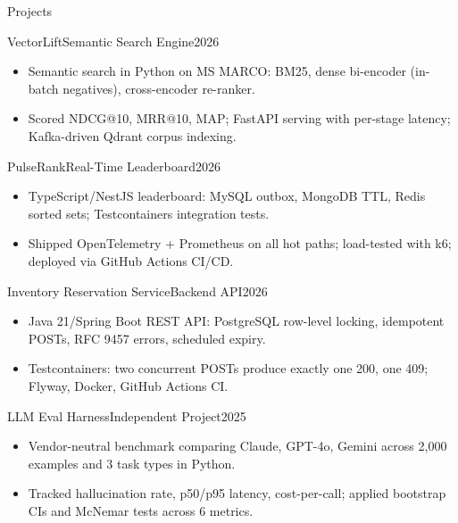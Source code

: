 \documentclass[]{mcdowellcv}
\begin{document}
\begin{cvsection}{Projects}
  \begin{cvsubsection}{VectorLift}{Semantic Search Engine}{2026}
    \begin{itemize}
      \item Semantic search in Python on MS MARCO: BM25, dense bi-encoder (in-batch negatives), cross-encoder re-ranker.
      \item Scored NDCG@10, MRR@10, MAP; FastAPI serving with per-stage latency; Kafka-driven Qdrant corpus indexing.
    \end{itemize}
    \vspace{-1.5pt}
  \end{cvsubsection}

  \begin{cvsubsection}{PulseRank}{Real-Time Leaderboard}{2026}
    \begin{itemize}
      \item TypeScript/NestJS leaderboard: MySQL outbox, MongoDB TTL, Redis sorted sets; Testcontainers integration tests.
      \item Shipped OpenTelemetry + Prometheus on all hot paths; load-tested with k6; deployed via GitHub Actions CI/CD.
    \end{itemize}
    \vspace{-1.5pt}
  \end{cvsubsection}

  \begin{cvsubsection}{Inventory Reservation Service}{Backend API}{2026}
    \begin{itemize}
      \item Java 21/Spring Boot REST API: PostgreSQL row-level locking, idempotent POSTs, RFC 9457 errors, scheduled expiry.
      \item Testcontainers: two concurrent POSTs produce exactly one 200, one 409; Flyway, Docker, GitHub Actions CI.
    \end{itemize}
    \vspace{-1.5pt}
  \end{cvsubsection}

  \begin{cvsubsection}{LLM Eval Harness}{Independent Project}{2025}
    \begin{itemize}
      \item Vendor-neutral benchmark comparing Claude, GPT-4o, Gemini across 2,000 examples and 3 task types in Python.
      \item Tracked hallucination rate, p50/p95 latency, cost-per-call; applied bootstrap CIs and McNemar tests across 6 metrics.
    \end{itemize}
  \end{cvsubsection}
\end{cvsection}
\end{document}
